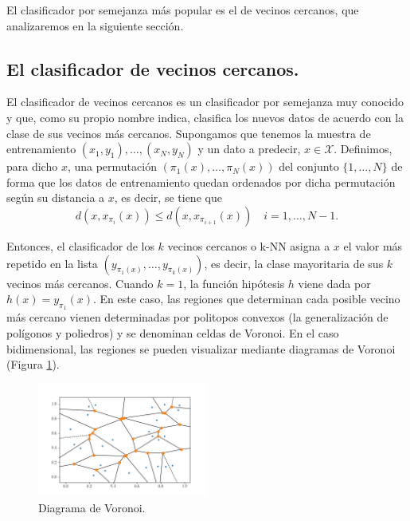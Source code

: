 El clasificador por semejanza más popular es el de vecinos cercanos, que analizaremos en la siguiente sección.

\subsection{El clasificador de vecinos cercanos.}

El clasificador de vecinos cercanos es un clasificador por semejanza muy conocido y que, como su propio nombre indica, clasifica los nuevos datos de acuerdo con la clase de sus vecinos más cercanos. Supongamos que tenemos la muestra de entrenamiento $(x_1,y_1),\dots,(x_N,y_N)$ y un dato a predecir, $x \in \mathcal{X}$. Definimos, para dicho $x$, una permutación $(\pi_1(x),\dots,\pi_N(x))$ del conjunto $\{1,\dots,N\}$ de forma que los datos de entrenamiento quedan ordenados por dicha permutación según su distancia a $x$, es decir, se tiene que
\[ d(x,x_{\pi_i}(x)) \le d(x,x_{\pi_{i+1}}(x)) \quad i=1,\dots,N-1. \]

Entonces, el clasificador de los $k$ vecinos cercanos o k-NN asigna a $x$ el valor más repetido en la lista $(y_{\pi_1(x)},\dots,y_{\pi_k(x)})$, es decir, la clase mayoritaria de sus $k$ vecinos más cercanos. Cuando $k=1$, la función hipótesis $h$ viene dada por $h(x) = y_{\pi_1}(x)$. En este caso, las regiones que determinan cada posible vecino más cercano vienen determinadas por politopos convexos (la generalización de polígonos y poliedros) y se denominan celdas de Voronoi. En el caso bidimensional, las regiones se pueden visualizar mediante diagramas de Voronoi (Figura \ref{fig:voronoi}).

\begin{figure}[h]
    \centering
    \includegraphics[width=0.5\textwidth]{./images/voronoi.png}
    \caption{Diagrama de Voronoi.} \label{fig:voronoi}
\end{figure}

